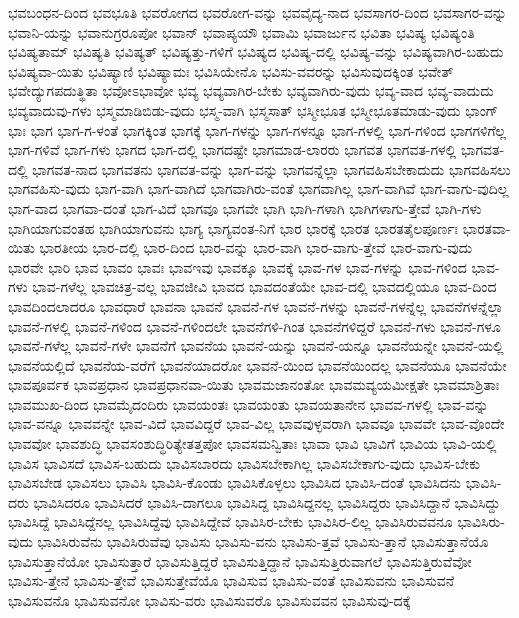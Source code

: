 {ಭವಬಂಧನ-ದಿಂದ
ಭವಭೂತಿ
ಭವರೋಗದ
ಭವರೋಗ-ವನ್ನು
ಭವವೈದ್ಯ-ನಾದ
ಭವಸಾಗರ-ದಿಂದ
ಭವಸಾಗರ-ವನ್ನು
ಭವಾನಿ-ಯನ್ನು
ಭವಾನುಗ್ರರೂಪೋ
ಭವಾನ್
ಭವಾಪ್ಯಯೌ
ಭವಾಮಿ
ಭವಾರ್ಜುನ
ಭವಿತಾ
ಭವಿಷ್ಯ
ಭವಿಷ್ಯಂತಿ
ಭವಿಷ್ಯತಾಮ್
ಭವಿಷ್ಯತಿ
ಭವಿಷ್ಯತ್
ಭವಿಷ್ಯತ್ತು-ಗಳಿಗೆ
ಭವಿಷ್ಯದ
ಭವಿಷ್ಯ-ದಲ್ಲಿ
ಭವಿಷ್ಯ-ವನ್ನು
ಭವಿಷ್ಯವಾಗಿರ-ಬಹುದು
ಭವಿಷ್ಯವಾ-ಯಿತು
ಭವಿಷ್ಯಾಣಿ
ಭವಿಷ್ಯಾಮಃ
ಭವಿಸಿಯೇನೊ
ಭವಿಸು-ವವರನ್ನು
ಭವಿಸುವುದಕ್ಕಿಂತ
ಭವೇತ್
ಭವೇದ್ಯುಗಪದುತ್ಥಿತಾ
ಭವೋಽಭಾವೋ
ಭವ್ಯ
ಭವ್ಯವಾಗಿರ-ಬೇಕು
ಭವ್ಯವಾಗಿರು-ವುದು
ಭವ್ಯ-ವಾದ
ಭವ್ಯ-ವಾದುದು
ಭವ್ಯವಾದುವು-ಗಳು
ಭಸ್ಮಮಾಡಿಬಿಡು-ವುದು
ಭಸ್ಮ-ವಾಗಿ
ಭಸ್ಮಸಾತ್
ಭಸ್ಮೀಭೂತ
ಭಸ್ಮೀಭೂತಮಾಡು-ವುದು
ಭಾಂಗ್
ಭಾಃ
ಭಾಗ
ಭಾಗ-ಗ-ಳಂತೆ
ಭಾಗಕ್ಕಿಂತ
ಭಾಗಕ್ಕೆ
ಭಾಗ-ಗಳನ್ನು
ಭಾಗ-ಗಳನ್ನೂ
ಭಾಗ-ಗಳಲ್ಲಿ
ಭಾಗ-ಗಳಿಂದ
ಭಾಗಗಳಿಗೆಲ್ಲ
ಭಾಗ-ಗಳಿವೆ
ಭಾಗ-ಗಳು
ಭಾಗದ
ಭಾಗ-ದಲ್ಲಿ
ಭಾಗದಷ್ಟೇ
ಭಾಗಮಾಡ-ಲಾರರು
ಭಾಗವತ
ಭಾಗವತ-ಗಳಲ್ಲಿ
ಭಾಗವತ-ದಲ್ಲಿ
ಭಾಗವತ-ನಾದ
ಭಾಗವತನು
ಭಾಗವತ-ವನ್ನು
ಭಾಗ-ವನ್ನು
ಭಾಗವನ್ನೆಲ್ಲಾ
ಭಾಗವಹಿಸಬೇಕಾದುದು
ಭಾಗವಹಿಸಲು
ಭಾಗವಹಿಸು-ವುದು
ಭಾಗ-ವಾಗಿ
ಭಾಗ-ವಾಗಿದೆ
ಭಾಗವಾಗಿರು-ವಂತೆ
ಭಾಗವಾಗಿಲ್ಲ
ಭಾಗ-ವಾಗಿವೆ
ಭಾಗ-ವಾಗು-ವುದಿಲ್ಲ
ಭಾಗ-ವಾದ
ಭಾಗವಾ-ದಂತೆ
ಭಾಗ-ವಿದೆ
ಭಾಗವೂ
ಭಾಗವೇ
ಭಾಗಿ
ಭಾಗಿ-ಗಳಾಗಿ
ಭಾಗಿಗಳಾಗು-ತ್ತೇವೆ
ಭಾಗಿ-ಗಳು
ಭಾಗಿಯಾಗುವಂತಹ
ಭಾಗಿಯಾಗುವನು
ಭಾಗ್ಯ
ಭಾಗ್ಯವಂತ-ನಿಗೆ
ಭಾರ
ಭಾರಕ್ಕೆ
ಭಾರತ
ಭಾರತತೈಲಪೂರ್ಣಃ
ಭಾರತವಾ-ಯಿತು
ಭಾರತೀಯ
ಭಾರ-ದಲ್ಲಿ
ಭಾರ-ದಿಂದ
ಭಾರ-ವನ್ನು
ಭಾರ-ವಾಗಿ
ಭಾರ-ವಾಗು-ತ್ತೇವೆ
ಭಾರ-ವಾಗು-ವುದು
ಭಾರವೇ
ಭಾರಿ
ಭಾವ
ಭಾವಂ
ಭಾವಃ
ಭಾವಇವು
ಭಾವಕ್ಕೂ
ಭಾವಕ್ಕೆ
ಭಾವ-ಗಳ
ಭಾವ-ಗಳನ್ನು
ಭಾವ-ಗಳಿಂದ
ಭಾವ-ಗಳು
ಭಾವ-ಗಳೆಲ್ಲ
ಭಾವಚಿತ್ರ-ವಲ್ಲ
ಭಾವಜೀವಿ
ಭಾವದ
ಭಾವದಂತೆಯೇ
ಭಾವ-ದಲ್ಲಿ
ಭಾವದಲ್ಲಿಯೂ
ಭಾವ-ದಿಂದ
ಭಾವದಿಂದಲಾದರೂ
ಭಾವಧಾರೆ
ಭಾವನಾ
ಭಾವನೆ
ಭಾವನೆ-ಗಳ
ಭಾವನೆ-ಗಳನ್ನು
ಭಾವನೆ-ಗಳನ್ನೆಲ್ಲ
ಭಾವನೆಗಳನ್ನೆಲ್ಲಾ
ಭಾವನೆ-ಗಳಲ್ಲಿ
ಭಾವನೆ-ಗಳಿಂದ
ಭಾವನೆ-ಗಳಿಂದಲೇ
ಭಾವನೆಗಳಿ-ಗಿಂತ
ಭಾವನೆಗಳಿದ್ದರೆ
ಭಾವನೆ-ಗಳು
ಭಾವನೆ-ಗಳೂ
ಭಾವನೆ-ಗಳೆಲ್ಲ
ಭಾವನೆ-ಗಳೇ
ಭಾವನೆಗೆ
ಭಾವನೆಯ
ಭಾವನೆ-ಯನ್ನು
ಭಾವನೆ-ಯನ್ನೂ
ಭಾವನೆಯನ್ನೇ
ಭಾವನೆ-ಯಲ್ಲಿ
ಭಾವನೆಯಲ್ಲಿದೆ
ಭಾವನೆಯ-ವರೆಗೆ
ಭಾವನೆಯಾದರೋ
ಭಾವನೆ-ಯಿಂದ
ಭಾವನೆಯಿಂದಲ್ಲ
ಭಾವನೆಯೂ
ಭಾವನೆಯೇ
ಭಾವಪೂರ್ವಕ
ಭಾವಪ್ರಧಾನ
ಭಾವಪ್ರಧಾನವಾ-ಯಿತು
ಭಾವಮಜಾನಂತೋ
ಭಾವಮವ್ಯಯಮೀಕ್ಷತೇ
ಭಾವಮಾಶ್ರಿತಾಃ
ಭಾವಮುಖ-ದಿಂದ
ಭಾವಮೈದಂದಿರು
ಭಾವಯಂತಃ
ಭಾವಯಂತು
ಭಾವಯತಾನೇನ
ಭಾವವ-ಗಳಲ್ಲಿ
ಭಾವ-ವನ್ನು
ಭಾವ-ವನ್ನೂ
ಭಾವವನ್ನೇ
ಭಾವ-ವಿದೆ
ಭಾವವಿದ್ದರೆ
ಭಾವ-ವಿಲ್ಲ
ಭಾವವುಳ್ಳವರಾಗಿ
ಭಾವವೂ
ಭಾವವೇ
ಭಾವ-ವೊಂದೇ
ಭಾವವೋ
ಭಾವಶುದ್ಧಿ
ಭಾವಸಂಶುದ್ಧಿರಿತ್ಯೇತತ್ತಪೋ
ಭಾವಸಮನ್ವಿತಾಃ
ಭಾವಾ
ಭಾವಿ
ಭಾವಿಗೆ
ಭಾವಿಯ
ಭಾವಿ-ಯಲ್ಲಿ
ಭಾವಿಸ
ಭಾವಿಸದೆ
ಭಾವಿಸ-ಬಹುದು
ಭಾವಿಸಬಾರದು
ಭಾವಿಸಬೇಕಾಗಿಲ್ಲ
ಭಾವಿಸಬೇಕಾಗು-ವುದು
ಭಾವಿಸ-ಬೇಕು
ಭಾವಿಸಬೇಡ
ಭಾವಿಸಲು
ಭಾವಿಸಿ
ಭಾವಿಸಿ-ಕೊಂಡು
ಭಾವಿಸಿಕೊಳ್ಳಲು
ಭಾವಿಸಿದ
ಭಾವಿಸಿ-ದಂತೆ
ಭಾವಿಸಿದನು
ಭಾವಿಸಿ-ದರು
ಭಾವಿಸಿದರೂ
ಭಾವಿಸಿದರೆ
ಭಾವಿಸಿ-ದಾಗಲೂ
ಭಾವಿಸಿದ್ದ
ಭಾವಿಸಿದ್ದನಲ್ಲ
ಭಾವಿಸಿದ್ದರು
ಭಾವಿಸಿದ್ದಾನೆ
ಭಾವಿಸಿದ್ದು
ಭಾವಿಸಿದ್ದೆ
ಭಾವಿಸಿದ್ದೆನಲ್ಲ
ಭಾವಿಸಿದ್ದೆವು
ಭಾವಿಸಿದ್ದೇವೆ
ಭಾವಿಸಿರ-ಬೇಕು
ಭಾವಿಸಿರ-ಲಿಲ್ಲ
ಭಾವಿಸಿರುವವನೂ
ಭಾವಿಸಿರು-ವುದು
ಭಾವಿಸಿರುವೆನು
ಭಾವಿಸಿರುವೆವು
ಭಾವಿಸು
ಭಾವಿಸು-ವನು
ಭಾವಿಸು-ತ್ತವೆ
ಭಾವಿಸು-ತ್ತಾನೆ
ಭಾವಿಸುತ್ತಾನೆಯೊ
ಭಾವಿಸುತ್ತಾನೆಯೋ
ಭಾವಿಸುತ್ತಾರೆ
ಭಾವಿಸುತ್ತಿದ್ದರೆ
ಭಾವಿಸುತ್ತಿದ್ದಾನೆ
ಭಾವಿಸುತ್ತಿರುವಾಗಲೆ
ಭಾವಿಸುತ್ತಿರುವೆವೋ
ಭಾವಿಸು-ತ್ತೇನೆ
ಭಾವಿಸು-ತ್ತೇವೆ
ಭಾವಿಸುತ್ತೇವೆಯೊ
ಭಾವಿಸುವ
ಭಾವಿಸು-ವಂತೆ
ಭಾವಿಸುವನು
ಭಾವಿಸುವನೆ
ಭಾವಿಸುವನೊ
ಭಾವಿಸುವನೋ
ಭಾವಿಸು-ವರು
ಭಾವಿಸುವರೊ
ಭಾವಿಸುವವನ
ಭಾವಿಸುವು-ದಕ್ಕೆ
}
